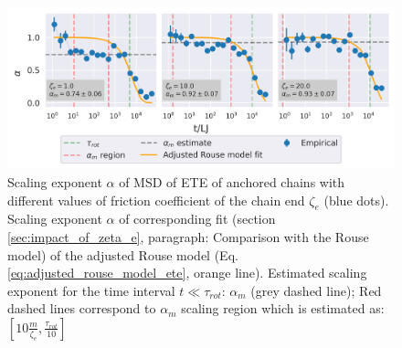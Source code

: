 \documentclass[
    paper=A4,pagesize=automedia,fontsize=12pt,
    BCOR=15mm,DIV=22,
    twoside,headinclude,footinclude=false,
    fleqn,             %
    bibliography=totocnumbered,          %
    listof=totoc,                %
    listof=flat,                 %
    cleardoublepage=empty      %
    numbers=endperiod
]{scrartcl}
\begin{document}
\begin{figure}
    \centering
    \includegraphics[width=\textwidth]{14+15+16-exp-alpha.png}
    \caption{Scaling exponent $\alpha$ of MSD of ETE 
    of anchored chains with different values of
    friction coefficient of the chain end $\zeta_e$ (blue dots).
    Scaling exponent $\alpha$ of corresponding fit 
    (section \ref{sec:impact_of_zeta_e}, 
    paragraph: Comparison with the Rouse model)
    of the adjusted Rouse model (Eq.\ref{eq:adjusted_rouse_model_ete}, 
    orange line). Estimated scaling exponent for the time interval
    $t \ll \tau_{rot}$: $\alpha_m$ (grey dashed line); Red dashed lines
    correspond to $\alpha_m$ scaling region which is estimated as:
    $[10 \frac{m}{\zeta_e}, \frac{\tau_{rot}}{10}]$
    }
    \label{fig:alpha_anchored_zeta}
\end{figure}
\end{document}

